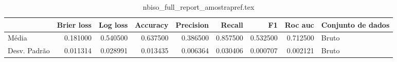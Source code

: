 \begin{table}
\centering
\caption{nbiso_full_report_amostrapref.tex}
\label{nbiso_full_report_amostrapref.tex}
\begin{tabular}{lrrrrrrrl}
\toprule
{} &  Brier  loss &  Log loss &  Accuracy  &  Precision  &   Recall  &       F1  &  Roc auc  & Conjunto de dados \\
\midrule
Média        &     0.181000 &  0.540500 &   0.637500 &    0.386500 &  0.857500 &  0.532500 &  0.712500 &             Bruto \\
Desv. Padrão &     0.011314 &  0.028991 &   0.013435 &    0.006364 &  0.030406 &  0.000707 &  0.002121 &             Bruto \\
\bottomrule
\end{tabular}
\end{table}

